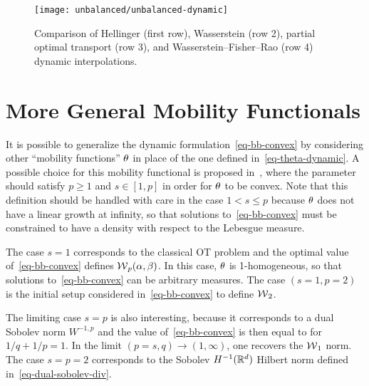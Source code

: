 \begin{figure}[h!]
\centering
\texttt{[image: unbalanced/unbalanced-dynamic]}
\caption{\label{fig-unbalanced-dynamic}
Comparison of Hellinger (first row), Wasserstein (row 2), partial optimal transport (row 3), and Wasserstein--Fisher--Rao (row 4) dynamic interpolations.
}
\end{figure}




\section{More General Mobility Functionals}
\label{eq-generic-modibility}

It is possible to generalize the dynamic formulation~\eqref{eq-bb-convex} by considering other ``mobility functions'' $\theta$ in place of the one defined in~\eqref{eq-theta-dynamic}. A possible choice for this mobility functional is proposed in~\citet{dolbeault2009new},
where the parameter should satisfy $p \geq 1$ and $s \in [1,p]$ in order for $\theta$ to be convex. 
%
Note that this definition should be handled with care in the case $1<s\leq p$ because $\theta$ does not have a linear growth at infinity, so that solutions to~\eqref{eq-bb-convex} must be constrained to have a density with respect to the Lebesgue measure. 

The case $s=1$ corresponds to the classical OT problem and the optimal value of~\eqref{eq-bb-convex} defines $\operatorname{\mathcal{W}}_p(\alpha,\beta)$. In this case, $\theta$ is 1-homogeneous, so that solutions to~\eqref{eq-bb-convex} can be arbitrary measures. The case $(s=1,p=2)$ is the initial setup considered in~\eqref{eq-bb-convex} to define $\operatorname{\mathcal{W}}_2$. 

The limiting case $s=p$ is also interesting, because it corresponds to a dual Sobolev norm $W^{-1,p}$ and the value of~\eqref{eq-bb-convex} is then equal to
for $1/q+1/p=1$.
%
In the limit $(p=s,q) \rightarrow (1,\infty)$, one recovers the $\operatorname{\mathcal{W}}_1$ norm.
%
The case $s=p=2$ corresponds to the Sobolev $H^{-1}(\mathbb{R}^d)$ Hilbert norm defined in~\eqref{eq-dual-sobolev-div}.



